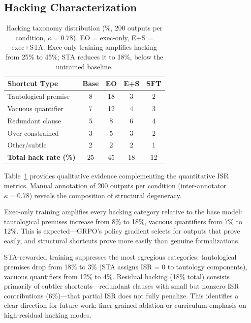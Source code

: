 \documentclass[11pt,a4paper]{article}
\begin{document}
\subsection{Hacking Characterization}
\label{sec:hacking}

\begin{table}[t]
\centering
\small
\begin{tabular}{lcccc}
\toprule
\textbf{Shortcut Type} & \textbf{Base} & \textbf{EO} & \textbf{E+S} & \textbf{SFT} \\
\midrule
Tautological premise & 8 & 18 & 3 & 2 \\
Vacuous quantifier & 7 & 12 & 4 & 3 \\
Redundant clause & 5 & 8 & 6 & 4 \\
Over-constrained & 3 & 5 & 3 & 2 \\
Other/subtle & 2 & 2 & 2 & 1 \\
\midrule
\textbf{Total hack rate (\%)} & 25 & 45 & 18 & 12 \\
\bottomrule
\end{tabular}
\caption{Hacking taxonomy distribution (\%, 200 outputs per condition, $\kappa = 0.78$). EO = exec-only, E+S = exec+STA. Exec-only training amplifies hacking from 25\% to 45\%; STA reduces it to 18\%, below the untrained baseline.}
\label{tab:hacking}
\end{table}

Table~\ref{tab:hacking} provides qualitative evidence complementing the quantitative ISR metrics. Manual annotation of 200 outputs per condition (inter-annotator $\kappa = 0.78$) reveals the composition of structural degeneracy.

Exec-only training amplifies every hacking category relative to the base model: tautological premises increase from 8\% to 18\%, vacuous quantifiers from 7\% to 12\%. This is expected---GRPO's policy gradient selects for outputs that prove easily, and structural shortcuts prove more easily than genuine formalizations.

STA-rewarded training suppresses the most egregious categories: tautological premises drop from 18\% to 3\% (STA assigns ISR = 0 to tautology components), vacuous quantifiers from 12\% to 4\%. Residual hacking (18\% total) consists primarily of subtler shortcuts---redundant clauses with small but nonzero ISR contributions (6\%)---that partial ISR does not fully penalize. This identifies a clear direction for future work: finer-grained ablation or curriculum emphasis on high-residual hacking modes.
\end{document}
